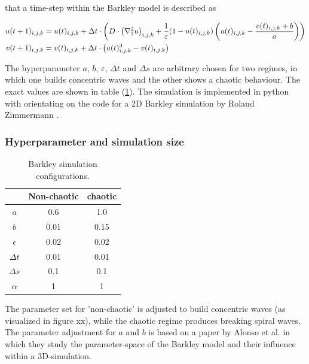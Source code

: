that a time-step within the Barkley model is described as 

\begin{align}
    u(t+1)_{i,j,k}&=u(t)_{i,j,k}+\Delta t\cdot\left(D\cdot \left(\nabla_7^2u\right)_{i,j,k}+\frac{1}{\varepsilon}(1-u(t)_{i,j,k})\left(u(t)_{i,j,k}-\frac{v(t)_{i,j,k}+b}{a}\right)\right)\notag\\
    v(t+1)_{i,j,k}&=v(t)_{i,j,k}+\Delta t\cdot\left(u(t)_{i,j,k}^{3}-v(t)_{i,j,k}\right)\notag\\
\end{align}

The hyperparameter $a$, $b$, $\varepsilon$, $\Delta t$ and $\Delta s$ are arbitrary chosen for two regimes, in which one builds concentric waves and the other shows a chaotic behaviour. The exact values are shown in table (\ref{tab:simulation_parameter}). The simulation is implemented in python with orientating on the code for a 2D Barkley simulation by Roland Zimmermann \cite{zimmermann}.
\subsubsection{Hyperparameter and simulation size}

\begin{table}[h]
    \centering
    \begin{tabular}{|c|c|c|}
    \hline
    & Non-chaotic & chaotic\\
    \hline
    $a$ & 0.6 & 1.0 \\
    \hline
    $b$ & 0.01 & 0.15 \\
    \hline
    $\epsilon$ & 0.02 & 0.02 \\
    \hline
    $\Delta t$ & 0.01 & 0.01 \\
    \hline
    $\Delta s$ & 0.1 & 0.1 \\
    \hline
    $\alpha$ & 1 & 1\\
    \hline
    \end{tabular}
    \caption{Barkley simulation configurations.}
    \label{tab:simulation_parameter}
\end{table}

The parameter set for 'non-chaotic' is adjusted to build concentric waves (as visualized in figure xx), while the chaotic regime produces breaking spiral waves. The parameter adjustment for $a$ and $b$ is based on a paper by Alonso et al. \cite{alonso_taming_2003} in which they study the parameter-space of the Barkley model and their influence within a 3D-simulation.

